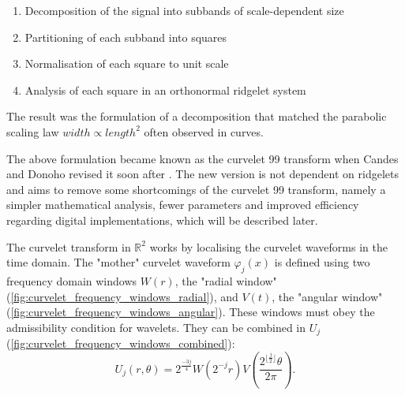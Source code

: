 \begin{enumerate}
    \item Decomposition of the signal into subbands of scale-dependent size
    \item Partitioning of each subband into squares
    \item Normalisation of each square to unit scale
    \item Analysis of each square in an orthonormal ridgelet system
\end{enumerate}

The result was the formulation of a decomposition that matched the parabolic
scaling law $width \propto length^2$ often observed in curves.

The above formulation became known as the curvelet 99 transform when Candes and
Donoho revised it soon after \autocite{candes_new_2004}. The new version is not
dependent on ridgelets and aims to remove some shortcomings of the curvelet 99
transform, namely a simpler mathematical analysis, fewer parameters and
improved efficiency regarding digital implementations, which will be described
later.

The curvelet transform in $\mathbb{R}^2$ works by localising the curvelet
waveforms in the time domain. The "mother" curvelet waveform $\varphi_j(x)$ is
defined using two frequency domain windows $W(r)$, the "radial window"
(\autoref{fig:curvelet_frequency_windows_radial}), and $V(t)$, the "angular
window" (\autoref{fig:curvelet_frequency_windows_angular}). These windows must
obey the admissibility condition for wavelets. They can be combined in $U_j$
(\autoref{fig:curvelet_frequency_windows_combined}):
\begin{equation*}
    U_j(r, \theta) = 2^\frac{-3j}{4} W(2^{-j}r) V(\frac{2^{\lfloor\frac{j}{2}\rfloor}\theta}{2 \pi}).
\end{equation*}

